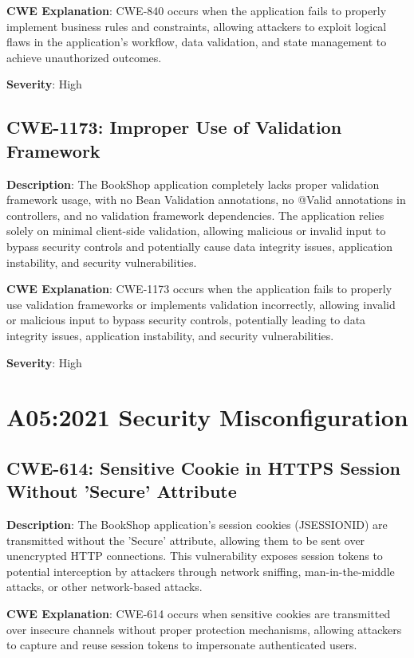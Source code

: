 \documentclass[]{UCD_CS_FYP_Report}
\begin{document}
\textbf{CWE Explanation}: CWE-840 occurs when the application fails to properly implement business rules and constraints, allowing attackers to exploit logical flaws in the application's workflow, data validation, and state management to achieve unauthorized outcomes.

\textbf{Severity}: High



\section{CWE-1173: Improper Use of Validation Framework}

\textbf{Description}: The BookShop application completely lacks proper validation framework usage, with no Bean Validation annotations, no @Valid annotations in controllers, and no validation framework dependencies. The application relies solely on minimal client-side validation, allowing malicious or invalid input to bypass security controls and potentially cause data integrity issues, application instability, and security vulnerabilities.

\textbf{CWE Explanation}: CWE-1173 occurs when the application fails to properly use validation frameworks or implements validation incorrectly, allowing invalid or malicious input to bypass security controls, potentially leading to data integrity issues, application instability, and security vulnerabilities.

\textbf{Severity}: High




\chapter{A05:2021 Security Misconfiguration}

\section{CWE-614: Sensitive Cookie in HTTPS Session Without 'Secure' Attribute}

\textbf{Description}: The BookShop application's session cookies (JSESSIONID) are transmitted without the 'Secure' attribute, allowing them to be sent over unencrypted HTTP connections. This vulnerability exposes session tokens to potential interception by attackers through network sniffing, man-in-the-middle attacks, or other network-based attacks.

\textbf{CWE Explanation}: CWE-614 occurs when sensitive cookies are transmitted over insecure channels without proper protection mechanisms, allowing attackers to capture and reuse session tokens to impersonate authenticated users.
\end{document}
